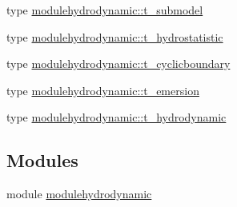 \begin{DoxyCompactItemize}
\item 
type \mbox{\hyperlink{structmodulehydrodynamic_1_1t__submodel}{modulehydrodynamic\+::t\+\_\+submodel}}
\item 
type \mbox{\hyperlink{structmodulehydrodynamic_1_1t__hydrostatistic}{modulehydrodynamic\+::t\+\_\+hydrostatistic}}
\item 
type \mbox{\hyperlink{structmodulehydrodynamic_1_1t__cyclicboundary}{modulehydrodynamic\+::t\+\_\+cyclicboundary}}
\item 
type \mbox{\hyperlink{structmodulehydrodynamic_1_1t__emersion}{modulehydrodynamic\+::t\+\_\+emersion}}
\item 
type \mbox{\hyperlink{structmodulehydrodynamic_1_1t__hydrodynamic}{modulehydrodynamic\+::t\+\_\+hydrodynamic}}
\end{DoxyCompactItemize}
\subsection*{Modules}
\begin{DoxyCompactItemize}
\item 
module \mbox{\hyperlink{namespacemodulehydrodynamic}{modulehydrodynamic}}
\end{DoxyCompactItemize}
